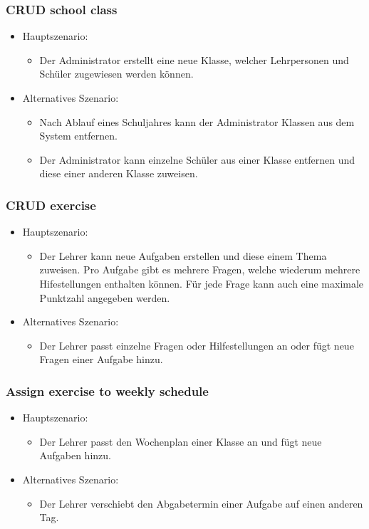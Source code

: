 \subsubsection*{CRUD school class}

\begin{itemize}
	\item Hauptszenario:
	\begin{itemize}
		\item Der Administrator erstellt eine neue Klasse, welcher Lehrpersonen und Schüler zugewiesen werden können.
	\end{itemize}
	\item Alternatives Szenario:
	\begin{itemize}
		\item Nach Ablauf eines Schuljahres kann der Administrator Klassen aus dem System entfernen.
		\item Der Administrator kann einzelne Schüler aus einer Klasse entfernen und diese einer anderen Klasse zuweisen.
	\end{itemize}
\end{itemize}


\subsubsection*{CRUD exercise}
\begin{itemize}
	\item Hauptszenario:
	\begin{itemize}
		\item Der Lehrer kann neue Aufgaben erstellen und diese einem Thema zuweisen. Pro Aufgabe gibt es mehrere Fragen, welche wiederum mehrere Hifestellungen enthalten können. Für jede Frage kann auch eine maximale Punktzahl angegeben werden. 
	\end{itemize}
	\item Alternatives Szenario:
	\begin{itemize}
		\item Der Lehrer passt einzelne Fragen oder Hilfestellungen an oder fügt neue Fragen einer Aufgabe hinzu.
	\end{itemize}
\end{itemize}



\subsubsection*{Assign exercise to weekly schedule}
\begin{itemize}
	\item Hauptszenario:
	\begin{itemize}
		\item Der Lehrer passt den Wochenplan einer Klasse an und fügt neue Aufgaben hinzu.
	\end{itemize}
	\item Alternatives Szenario:
	\begin{itemize}
		\item Der Lehrer verschiebt den Abgabetermin einer Aufgabe auf einen anderen Tag.
	\end{itemize}
\end{itemize}



